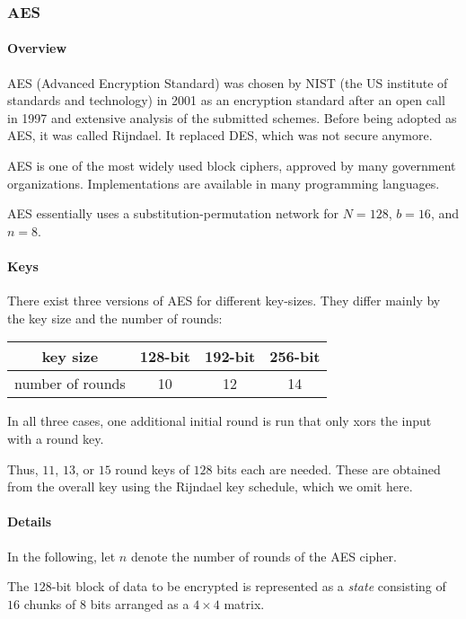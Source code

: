 \subsubsection{AES}

\paragraph{Overview}
AES (Advanced Encryption Standard) was chosen by NIST (the US institute of standards and technology) in 2001 as an encryption standard after an open call in 1997 and extensive analysis of the submitted schemes.
Before being adopted as AES, it was called Rijndael.
It replaced DES, which was not secure anymore.

AES is one of the most widely used block ciphers, approved by many government organizations.
Implementations are available in many programming languages.

AES essentially uses a substitution-permutation network for $N=128$, $b=16$, and $n=8$.

\paragraph{Keys}
There exist three versions of AES for different key-sizes.
They differ mainly by the key size and the number of rounds:
\begin{center}
  \begin{tabular}{|c|c|c|c|}
  	\hline key size & 128-bit & 192-bit & 256-bit \\ 
  	\hline number of rounds & 10 & 12 & 14 \\ 
  	\hline
  \end{tabular}
\end{center}
In all three cases, one additional initial round is run that only xors the input with a round key.

Thus, $11$, $13$, or $15$ round keys of $128$ bits each are needed.
These are obtained from the overall key using the Rijndael key schedule, which we omit here.

\paragraph{Details}
In the following, let $n$ denote the number of rounds of the AES cipher.

The $128$-bit block of data to be encrypted is represented as a \emph{state} consisting of $16$ chunks of $8$ bits arranged as a $4\times 4$ matrix.

